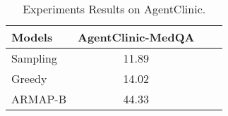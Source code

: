 \begin{table*}[!h]
    \centering
    \begin{tabular}{lccc}
    \toprule
    Models    & AgentClinic-MedQA  \\
    \midrule
    Sampling  & 11.89  \\
    Greedy  & 14.02 \\
    ARMAP-B & 44.33 \\
    \bottomrule
    \end{tabular}
    \caption{Experiments Results on AgentClinic.}
    \label{tab:clinic}
\end{table*}